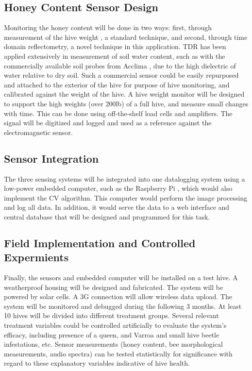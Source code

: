 \subsection{Honey Content Sensor Design}
Monitoring the honey content will be done in two ways: first, through measurement of the hive weight \cite{meikle2008within}, a standard technique, and second, through time domain reflectometry, a novel technique in this application. TDR has been applied extensively in measurement of soil water content, such as with the commercially available soil probes from Acclima \cite{blonquist2005time, schwartz2016evaluation}, due to the high dielectric of water relative to dry soil. Such a commercial sensor could be easily repurposed and attached to the exterior of the hive for purpose of hive monitoring, and calibrated against the weight of the hive. A hive weight monitor will be designed to support the high weights (over 200lb) of a full hive, and measure small changes with time. This can be done using off-the-shelf load cells and amplifiers. The signal will be digitized and logged and used as a reference against the electromagnetic sensor.

\subsection{Sensor Integration}

The three sensing systems will be integrated into one datalogging system using a low-power embedded computer, such as the Raspberry Pi \cite{upton2014raspberry}, which would also implement the CV algorithm. This computer would perform the image processing and log all data. In addition, it would serve the data to a web interface and central database that will be designed and programmed for this task. 

\subsection{Field Implementation and Controlled Expermients}

Finally, the sensors and embedded computer will be installed on a test hive. A weatherproof housing will be designed and fabricated.  The system will be powered by solar cells. A 3G connection will allow wireless data upload. The system will be monitored and debugged during the following 3 months. At least 10 hives will be divided into different treatment groups. Several relevant treatment variables could be controlled
artificially to evaluate the system’s efficacy, including presence of a queen, and Varroa and small hive beetle infestations, etc. Sensor measurements (honey content, bee morphological measurements, audio spectra) can be tested statistically for significance with regard to these explanatory variables indicative of hive health.

